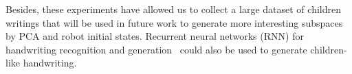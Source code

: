 \documentclass[conference]{IEEEtran}
\begin{document}
Besides, these experiments have allowed us to collect a large dataset of children writings that will be
used in future work to generate more interesting subspaces by PCA and robot initial states. 
Recurrent neural networks (RNN) for handwriting recognition and generation~\cite{DBLP:journals/corr/Graves13} could also be used to generate 
children-like handwriting.




 
\end{document}
